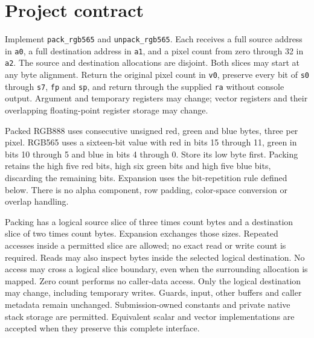 \section*{Project contract}
Implement \texttt{pack\_rgb565} and \texttt{unpack\_rgb565}. Each receives a full
source address in \texttt{a0}, a full destination address in \texttt{a1}, and a
pixel count from zero through 32 in \texttt{a2}. The source and destination
allocations are disjoint. Both slices may start at any byte alignment. Return the
original pixel count in \texttt{v0}, preserve every bit of \texttt{s0} through
\texttt{s7}, \texttt{fp} and \texttt{sp}, and return through the supplied
\texttt{ra} without console output. Argument and temporary registers may change;
vector registers and their overlapping floating-point register storage may change.

Packed RGB888 uses consecutive unsigned red, green and blue bytes, three per pixel.
RGB565 uses a sixteen-bit value with red in bits 15 through 11, green in bits 10
through 5 and blue in bits 4 through 0. Store its low byte first. Packing retains
the high five red bits, high six green bits and high five blue bits, discarding
the remaining bits. Expansion uses the bit-repetition rule defined below. There
is no alpha component, row padding, color-space conversion or overlap handling.

Packing has a logical source slice of three times count bytes and a destination
slice of two times count bytes. Expansion exchanges those sizes. Repeated accesses
inside a permitted slice are allowed; no exact read or write count is required. Reads may also inspect bytes inside the selected logical destination.
No access may cross a logical slice boundary, even when the surrounding allocation
is mapped. Zero count performs no caller-data access. Only the logical destination
may change, including temporary writes. Guards, input, other buffers and caller
metadata remain unchanged. Submission-owned constants and private native stack
storage are permitted. Equivalent scalar and vector implementations are accepted
when they preserve this complete interface.
